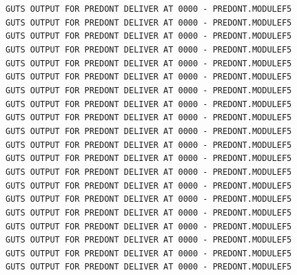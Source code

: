 \texttt{GUTS OUTPUT FOR PREDONT DELIVER AT 0000 - PREDONT.MODULEF5}\\
\texttt{GUTS OUTPUT FOR PREDONT DELIVER AT 0000 - PREDONT.MODULEF5}\\
\texttt{GUTS OUTPUT FOR PREDONT DELIVER AT 0000 - PREDONT.MODULEF5}\\
\texttt{GUTS OUTPUT FOR PREDONT DELIVER AT 0000 - PREDONT.MODULEF5}\\
\texttt{GUTS OUTPUT FOR PREDONT DELIVER AT 0000 - PREDONT.MODULEF5}\\
\texttt{GUTS OUTPUT FOR PREDONT DELIVER AT 0000 - PREDONT.MODULEF5}\\
\texttt{GUTS OUTPUT FOR PREDONT DELIVER AT 0000 - PREDONT.MODULEF5}\\
\texttt{GUTS OUTPUT FOR PREDONT DELIVER AT 0000 - PREDONT.MODULEF5}\\
\texttt{GUTS OUTPUT FOR PREDONT DELIVER AT 0000 - PREDONT.MODULEF5}\\
\texttt{GUTS OUTPUT FOR PREDONT DELIVER AT 0000 - PREDONT.MODULEF5}\\
\texttt{GUTS OUTPUT FOR PREDONT DELIVER AT 0000 - PREDONT.MODULEF5}\\
\texttt{GUTS OUTPUT FOR PREDONT DELIVER AT 0000 - PREDONT.MODULEF5}\\
\texttt{GUTS OUTPUT FOR PREDONT DELIVER AT 0000 - PREDONT.MODULEF5}\\
\texttt{GUTS OUTPUT FOR PREDONT DELIVER AT 0000 - PREDONT.MODULEF5}\\
\texttt{GUTS OUTPUT FOR PREDONT DELIVER AT 0000 - PREDONT.MODULEF5}\\
\texttt{GUTS OUTPUT FOR PREDONT DELIVER AT 0000 - PREDONT.MODULEF5}\\
\texttt{GUTS OUTPUT FOR PREDONT DELIVER AT 0000 - PREDONT.MODULEF5}\\
\texttt{GUTS OUTPUT FOR PREDONT DELIVER AT 0000 - PREDONT.MODULEF5}\\
\texttt{GUTS OUTPUT FOR PREDONT DELIVER AT 0000 - PREDONT.MODULEF5}\\
\texttt{GUTS OUTPUT FOR PREDONT DELIVER AT 0000 - PREDONT.MODULEF5}\\
